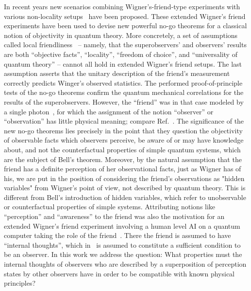 \documentclass[a4paper,twocolumn,11pt,accepted=2017-05-09,dvipsnames]{quantumarticle}
\numberwithin{equation}{section}
\begin{document}
In recent years new scenarios combining Wigner's-friend-type experiments with various non-locality setups~\cite{Zukowski2020,Leegwater:2018aa,brukner2018no,frauchiger2018quantum,brukner2017quantum} have been proposed. These extended Wigner's friend experiments have been used to devise new powerful no-go theorems for a classical notion of objectivity in quantum theory.
More concretely, a set of assumptions called local friendliness~\cite{Bong2020}  --  namely, that the superobservers’ and observers’ results are both ``objective facts'', ``locality'', ``freedom of choice'', and ``universality of quantum theory'' -- cannot all hold in extended Wigner's friend setups. The last assumption asserts that the unitary description of the friend's measurement correctly predicts Winger's observed statistics. The performed proof-of-principle tests of the no-go theorems confirm the quantum mechanical correlations for the results of the superobservers. However, the ``friend'' was in that case modeled by  a single photon~\cite{proietti2019experimental,Bong2020}, for which the assignment of the notion ``observer'' or ``observation'' has little physical meaning; compare Ref.~\cite{brukner2021qubits}.  
{The significance of the new no-go theorems lies precisely in the point that they question the objectivity of observable facts which observers perceive, be aware of or may have knowledge about, and not the counterfactual properties of simple quantum systems, which are the subject of Bell's theorem. Moreover, by the natural assumption that the friend has a definite perception of her observational facts, just as Wigner has of his, we are put in the position of considering the friend's observations as "hidden variables" from Wigner's point of view, not described by quantum theory. This is different from Bell's introduction of hidden variables, which refer to unobservable or counterfactual properties of simple systems. Attributing notions like ``perception'' and ``awareness'' to the friend
was also the motivation for } an extended Wigner's friend experiment involving a human level AI on a quantum computer taking the role of the friend~\cite{wiseman2023thoughtful}. There the friend is assumed to have ``internal thoughts'', which in~\cite{wiseman2023thoughtful} is assumed to constitute a sufficient condition to be an observer. In this work we address the question: What properties must the internal thoughts of observers who are described by a superposition of perception states by other observers have in order to be compatible with known physical principles?
\end{document}
